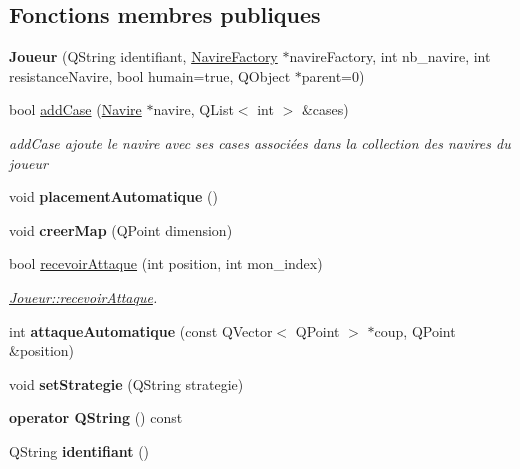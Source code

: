 \subsection*{Fonctions membres publiques}
\begin{DoxyCompactItemize}
\item 
{\bfseries Joueur} (Q\+String identifiant, \hyperlink{class_navire_factory}{Navire\+Factory} $\ast$navire\+Factory, int nb\+\_\+navire, int resistance\+Navire, bool humain=true, Q\+Object $\ast$parent=0)\hypertarget{class_joueur_a0f254ef9e5c9a22dc174fa4672078242}{}\label{class_joueur_a0f254ef9e5c9a22dc174fa4672078242}

\item 
bool \hyperlink{class_joueur_afe82d80d5b5f48f40de36cbd420dcab1}{add\+Case} (\hyperlink{class_navire}{Navire} $\ast$navire, Q\+List$<$ int $>$ \&cases)
\begin{DoxyCompactList}\small\item\em add\+Case ajoute le navire avec ses cases associées dans la collection des navires du joueur \end{DoxyCompactList}\item 
void {\bfseries placement\+Automatique} ()\hypertarget{class_joueur_a582ea6ef1f7cd5a6d2259958e34f181a}{}\label{class_joueur_a582ea6ef1f7cd5a6d2259958e34f181a}

\item 
void {\bfseries creer\+Map} (Q\+Point dimension)\hypertarget{class_joueur_a615622a48fb0da97f7015ec35826c418}{}\label{class_joueur_a615622a48fb0da97f7015ec35826c418}

\item 
bool \hyperlink{class_joueur_a6dff19070bdd6e9f1fdbac056a563b08}{recevoir\+Attaque} (int position, int mon\+\_\+index)
\begin{DoxyCompactList}\small\item\em \hyperlink{class_joueur_a6dff19070bdd6e9f1fdbac056a563b08}{Joueur\+::recevoir\+Attaque}. \end{DoxyCompactList}\item 
int {\bfseries attaque\+Automatique} (const Q\+Vector$<$ Q\+Point $>$ $\ast$coup, Q\+Point \&position)\hypertarget{class_joueur_a679e730ac2c283452a818e83b02c1990}{}\label{class_joueur_a679e730ac2c283452a818e83b02c1990}

\item 
void {\bfseries set\+Strategie} (Q\+String strategie)\hypertarget{class_joueur_ac10802f705a39547e7433cffbcd901e1}{}\label{class_joueur_ac10802f705a39547e7433cffbcd901e1}

\item 
{\bfseries operator Q\+String} () const \hypertarget{class_joueur_ad6f3af78b8c26e447f218c31f5278845}{}\label{class_joueur_ad6f3af78b8c26e447f218c31f5278845}

\item 
Q\+String {\bfseries identifiant} ()\hypertarget{class_joueur_a72d82a284c89ae702dd1bc352284f65f}{}\label{class_joueur_a72d82a284c89ae702dd1bc352284f65f}

\end{DoxyCompactItemize}

